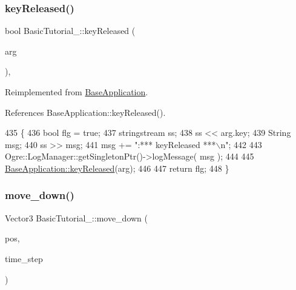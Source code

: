 \mbox{\label{class_basic_tutorial__00_aacca7a0a2a5a0e0d007b9c6c30b4941b}} 
\subsubsection{\texorpdfstring{key\+Released()}{keyReleased()}}
{\footnotesize\ttfamily bool Basic\+Tutorial\+\_\+::key\+Released (\begin{DoxyParamCaption}\item[{const O\+I\+S\+::\+Key\+Event \&}]{arg }\end{DoxyParamCaption})\hspace{0.3cm}{\ttfamily [protected]}, {\ttfamily [virtual]}}



Reimplemented from \hyperlink{class_base_application_aba5c7c9dea7a0efc58b89310bae547e5}{Base\+Application}.



References Base\+Application\+::key\+Released().


\begin{DoxyCode}
435 \{
436     \textcolor{keywordtype}{bool} flg = \textcolor{keyword}{true};
437     stringstream ss;
438     ss << arg.key;
439     String msg;
440     ss >> msg;
441     msg += \textcolor{stringliteral}{":*** keyReleased ***\(\backslash\)n"};
442     
443     Ogre::LogManager::getSingletonPtr()->logMessage( msg );
444 
445     \hyperlink{class_base_application_aba5c7c9dea7a0efc58b89310bae547e5}{BaseApplication::keyReleased}(arg);
446 
447     \textcolor{keywordflow}{return} flg;
448 \}
\end{DoxyCode}
\mbox{\label{class_basic_tutorial__00_a90e8fc0b5789c3897a87b08e45bf6fe0}} 
\subsubsection{\texorpdfstring{move\+\_\+down()}{move\_down()}}
{\footnotesize\ttfamily Vector3 Basic\+Tutorial\+\_\+::move\+\_\+down (\begin{DoxyParamCaption}\item[{Vector3}]{pos,  }\item[{float}]{time\+\_\+step }\end{DoxyParamCaption})\hspace{0.3cm}{\ttfamily [virtual]}}



